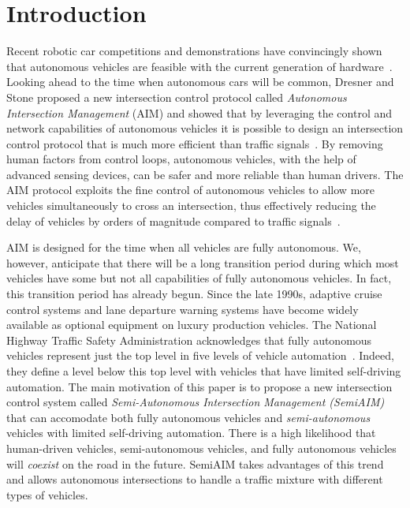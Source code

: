 \section{Introduction}
\label{sec:introduction}

Recent robotic car competitions and demonstrations have convincingly
shown that autonomous vehicles are feasible with the current
generation of hardware~\cite{mybib:Darpa07Urban}. Looking ahead to the
time when autonomous cars will be common, Dresner and Stone proposed a
new intersection control protocol called \emph{Autonomous Intersection
Management} (AIM) and showed that by leveraging the control and
network capabilities of autonomous vehicles it is possible to design
an intersection control protocol that is much more efficient than
traffic signals~\cite{bib:Dresner08Multiagent}.  By removing human
factors from control loops, autonomous vehicles, with the help of
advanced sensing devices, can be safer and more reliable than human
drivers.  The AIM protocol exploits the fine control of autonomous
vehicles to allow more vehicles simultaneously to cross an
intersection, thus effectively reducing the delay of vehicles by
orders of magnitude compared to traffic
signals~\cite{mybib:Fajardo12Automated}.

AIM is designed for the time when all vehicles are fully autonomous.  We,
however, anticipate that there will be a long transition period during
which most vehicles have some but not all capabilities of fully
autonomous vehicles.  In fact, this transition period has already
begun. Since the late 1990s, adaptive cruise control systems and lane
departure warning systems have become widely available as optional
equipment on luxury production vehicles. 
% 
The National Highway Traffic Safety Administration acknowledges that
fully autonomous vehicles represent just the top level in five levels
of vehicle automation~\cite{mybib:NHTSA13Preliminary}. Indeed, they
define a level below this top level with vehicles that
have limited self-driving automation.
The main motivation of this paper is to
propose a new intersection control system called
\emph{Semi-Autonomous Intersection Management (SemiAIM)} that can
accomodate both fully autonomous vehicles and
\emph{semi-autonomous} vehicles with limited self-driving automation.
There is a high likelihood that
human-driven vehicles, semi-autonomous vehicles, and fully autonomous
vehicles will \emph{coexist} on the road in the future.  SemiAIM takes
advantages of this trend and allows autonomous intersections to handle
a traffic mixture with different types of vehicles.

